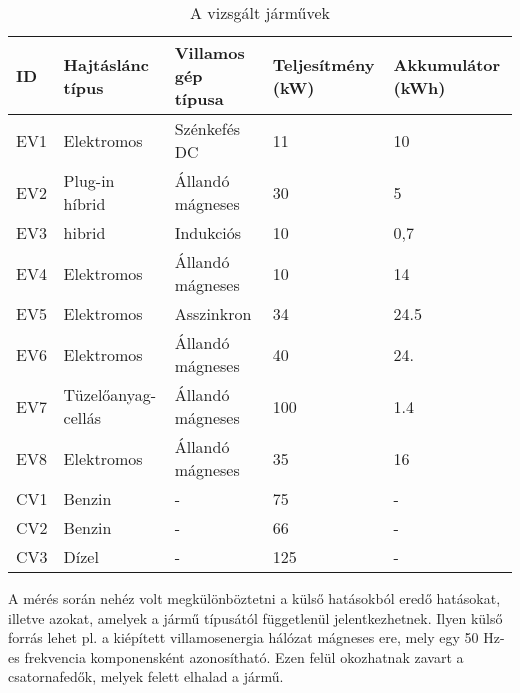 \begin{table}[h]
\centering
\caption{A vizsgált járművek}
\label{my-label}
\begin{tabular}{lllll}
\hline
\multicolumn{1}{|l}{ID} & Hajtáslánc típus   & Villamos gép típusa & Teljesítmény (kW) & Akkumulátor (kWh) \\ \hline
EV1                     & Elektromos         & Szénkefés DC        & 11                & 10                          \\
EV2                     & Plug-in híbrid     & Állandó mágneses    & 30                & 5                           \\
EV3                     & hibrid             & Indukciós           & 10                & 0,7                         \\
EV4                     & Elektromos         & Állandó mágneses    & 10                & 14                          \\
EV5                     & Elektromos         & Asszinkron          & 34                & 24.5                        \\
EV6                     & Elektromos         & Állandó mágneses    & 40                & 24.                         \\
EV7                     & Tüzelőanyag-cellás & Állandó mágneses    & 100               & 1.4                         \\
EV8                     & Elektromos         & Állandó mágneses    & 35                & 16                          \\
CV1                     & Benzin             & -                   & 75                & -                           \\
CV2                     & Benzin             & -                   & 66                & -                           \\
CV3                     & Dízel              & -                   & 125               & -                           \\ \hline
\end{tabular}
\end{table}

A mérés során nehéz volt megkülönböztetni a külső hatásokból eredő hatásokat, illetve azokat, amelyek a jármű típusától függetlenül jelentkezhetnek. Ilyen külső forrás lehet pl. a kiépített villamosenergia hálózat mágneses ere, mely egy 50 Hz-es frekvencia komponensként azonosítható. Ezen felül okozhatnak zavart a csatornafedők, melyek felett elhalad a jármű.

